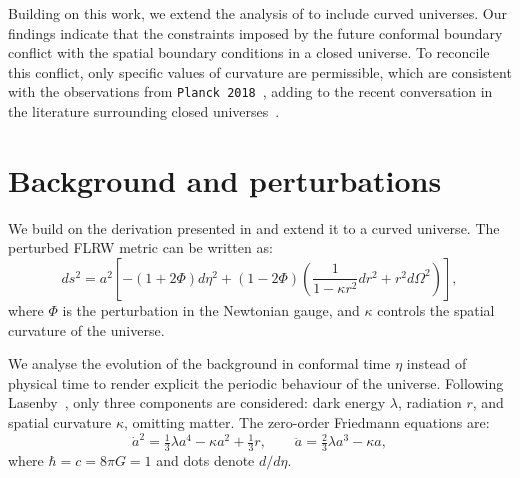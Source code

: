 \documentclass[%
 reprint,
 amsmath,amssymb,
 prl,
]{revtex4-2}
\begin{document}
Building on this work, we extend the analysis of \citet{2022PhRvD.105h3514L} to include curved universes. Our findings indicate that the constraints imposed by the future conformal boundary conflict with the spatial boundary conditions in a closed universe. To reconcile this conflict, only specific values of curvature are permissible, which are consistent with the observations from \texttt{Planck 2018}~\cite{2020A&A...641A...6P}, adding to the recent conversation in the literature surrounding closed universes~\cite{2020NatAs...4..196D, 2021PhRvD.103d1301H, 2022MNRAS.517.3087G, 2020MNRAS.496L..91E}.


\section{Background and perturbations} 
We build on the derivation presented in \citet{2022PhRvD.105h3514L} and extend it to a curved universe. The perturbed FLRW metric can be written as:
\begin{equation}
    ds^2 = a^2 \left[-(1 + 2\Phi)d\eta^2 + (1 - 2\Phi)\left(\frac{1}{1-\kappa r^2}dr^2+r^2d\Omega^2\right) \right],
\end{equation}
where \(\Phi\) is the perturbation in the Newtonian gauge, and $\kappa$ controls the spatial curvature of the universe.

We analyse the evolution of the background in conformal time \(\eta\) instead of physical time to render explicit the periodic behaviour of the universe. Following Lasenby~\cite{2022PhRvD.105h3514L}, only three components are considered: dark energy $\lambda$, radiation $r$, and spatial curvature $\kappa$, omitting matter. The zero-order Friedmann equations are: 
\begin{equation}\label{eq:friedmann_eq}
    \dot{a}^2 = \tfrac{1}{3}\lambda a^4 - \kappa a^2  + \tfrac{1}{3} r, \qquad 
    \ddot{a} = \tfrac{2}{3}\lambda a^3 - \kappa a,
\end{equation}
where \(\hbar = c = 8\pi G = 1\) and dots denote \(d/d\eta\).
\end{document}
